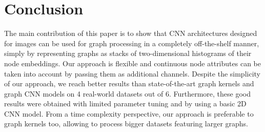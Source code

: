 \documentclass[sigconf]{acmart}
\begin{document}
\section{Conclusion}
The main contribution of this paper is to show that CNN architectures designed for images can be used for graph processing in a completely off-the-shelf manner, simply by representing graphs as stacks of two-dimensional histograms of their node embeddings. Our approach is flexible and continuous node attributes can be taken into account by passing them as additional channels. Despite the simplicity of our approach, we reach better results than state-of-the-art graph kernels and graph CNN models on 4 real-world datasets out of 6. Furthermore, these good results were obtained with limited parameter tuning and by using a basic 2D CNN model. From a time complexity perspective, our approach is preferable to graph kernels too, allowing to process bigger datasets featuring larger graphs.



\end{document}

